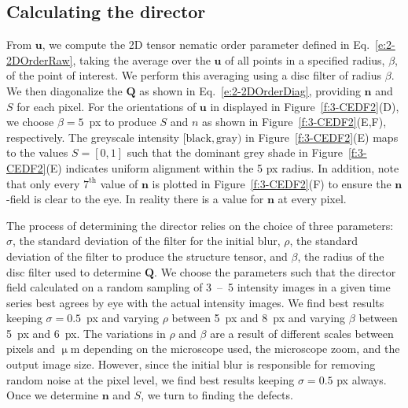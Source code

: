 \subsection{Calculating the director}
From $\mathbf{u}$, we compute the 2D tensor nematic order parameter defined in Eq.~\ref{e:2-2DOrderRaw}, taking the average over the $\mathbf{u}$ of all points in a specified radius, $\beta$, of the point of interest.
We perform this averaging using a disc filter of radius $\beta$.
We then diagonalize the $\mathbf{Q}$ as shown in Eq.~\ref{e:2-2DOrderDiag}, providing $\mathbf{n}$ and $S$ for each pixel.
For the orientations of $\mathbf{u}$ in displayed in Figure~\ref{f:3-CEDF2}(D), we choose $\beta = 5$~px to produce $S$ and $n$ as shown in Figure~\ref{f:3-CEDF2}(E,F), respectively.
The greyscale intensity $[\textrm{black}, \textrm{gray})$ in Figure~\ref{f:3-CEDF2}(E) maps to the values $S = [0, 1]$ such that the dominant grey shade in Figure~\ref{f:3-CEDF2}(E) indicates uniform alignment within the 5 px radius.
In addition, note that only every $7^{\textrm{th}}$ value of $\mathbf{n}$ is plotted in Figure~\ref{f:3-CEDF2}(F) to ensure the $\mathbf{n}$-field is clear to the eye.
In reality there is a value for $\mathbf{n}$ at every pixel.

The process of determining the director relies on the choice of three parameters: $\sigma$, the standard deviation of the filter for the initial blur, $\rho$, the standard deviation of the filter to produce the structure tensor, and $\beta$, the radius of the disc filter used to determine $\mathbf{Q}$.
We choose the parameters such that the director field calculated on a random sampling of 3~--~5 intensity images in a given time series best agrees by eye with the actual intensity images.
We find best results keeping $\sigma = 0.5$~px and varying $\rho$ between 5~px and 8~px and varying $\beta$ between 5~px and 6~px.
The variations in $\rho$ and $\beta$ are a result of different scales between pixels and $\upmu$m depending on the microscope used, the microscope zoom, and the output image size.
However, since the initial blur is responsible for removing random noise at the pixel level, we find best results keeping $\sigma = 0.5$ px always.
Once we determine $\mathbf{n}$ and $S$, we turn to finding the defects.


